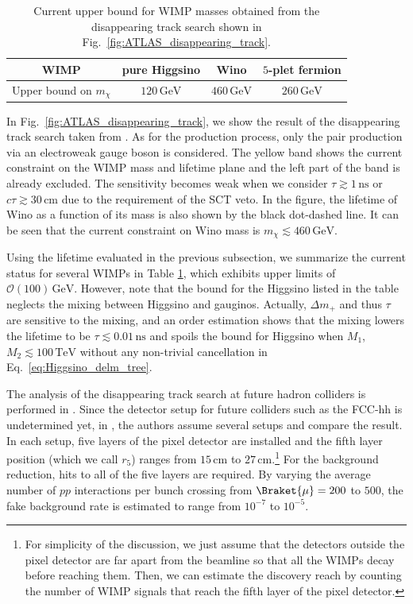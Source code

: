 \documentclass[12pt,twoside,book]{article}
\begin{document}
\begin{table}[t]
  \centering
  \begin{tabular}{c|ccc}
    WIMP & pure Higgsino & Wino & $5$-plet fermion \\ \hline
    Upper bound on $m_\chi$ & $120\, \mathrm{GeV}$ & $460\, \mathrm{GeV}$
    & $260\, \mathrm{GeV}$
  \end{tabular}
  \caption{
    Current upper bound for WIMP masses obtained from the disappearing track search shown in Fig.~\ref{fig:ATLAS_disappearing_track}.}
  \label{tab:disp_track_current}
\end{table}

In Fig.~\ref{fig:ATLAS_disappearing_track}, we show the result of the disappearing track search taken from \cite{Aaboud:2017mpt}.
As for the production process, only the pair production via an electroweak gauge boson is considered.
The yellow band shows the current constraint on the WIMP mass and lifetime plane and the left part of the band is already excluded.
The sensitivity becomes weak when we consider $\tau \gtrsim 1\, \mathrm{ns}$ or $c \tau \gtrsim 30\, \mathrm{cm}$ due to the requirement of the SCT veto.
In the figure, the lifetime of Wino as a function of its mass is also shown by the black dot-dashed line.
It can be seen that the current constraint on Wino mass is $m_\chi \lesssim 460\,\mathrm{GeV}$.

Using the lifetime evaluated in the previous subsection, we summarize the current status for several WIMPs in Table \ref{tab:disp_track_current}, which exhibits upper limits of $\mathcal{O} (100)\,\mathrm{GeV}$.
However, note that the bound for the Higgsino listed in the table neglects the mixing between Higgsino and gauginos.
Actually, $\Delta m_{+}$ and thus $\tau$ are sensitive to the mixing, and an order estimation shows that the mixing lowers the lifetime to be $\tau \lesssim 0.01\,\mathrm{ns}$ and spoils the bound for Higgsino when $M_1$, $M_2 \lesssim 100\,\mathrm{TeV}$ without any non-trivial cancellation in Eq.~\eqref{eq:Higgsino_delm_tree}.

The analysis of the disappearing track search at future hadron colliders is performed in \cite{Han:2018wus, Saito:2019rtg}.
Since the detector setup for future colliders such as the FCC-hh is undetermined yet, in \cite{Saito:2019rtg}, the authors assume several setups and compare the result.
In each setup, five layers of the pixel detector are installed and the fifth layer position (which we call $r_5$) ranges from $15\, \mathrm{cm}$ to $27\, \mathrm{cm}$.\footnote
{
  For simplicity of the discussion, we just assume that the detectors outside the pixel detector are far apart from the beamline so that all the WIMPs decay before reaching them.
  Then, we can estimate the discovery reach by counting the number of WIMP signals that reach the fifth layer of the pixel detector.
}
For the background reduction, hits to all of the five layers are required.
By varying the average number of $pp$ interactions per bunch crossing from $\Braket{\mu} = 200$ to $500$, the fake background rate is estimated to range from $10^{-7}$ to $10^{-5}$.
\end{document}
